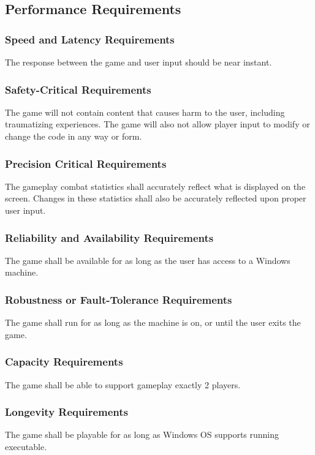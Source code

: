\documentclass{article}
\begin{document}
\subsection{Performance Requirements}

\subsubsection{Speed and Latency Requirements}
The response between the game and user input should be near instant.

\subsubsection{Safety-Critical Requirements}
The game will not contain content that causes harm to the user, including traumatizing experiences. The game will also not allow player input to modify or change the code in any way or form.

\subsubsection{Precision Critical Requirements}
The gameplay combat statistics shall accurately reflect what is displayed on the screen. Changes in these statistics shall also be accurately reflected upon proper user input.

\subsubsection{Reliability and Availability Requirements}
The game shall be available for as long as the user has access to a Windows machine.

\subsubsection{Robustness or Fault-Tolerance Requirements}
The game shall run for as long as the machine is on, or until the user exits the game.

\subsubsection{Capacity Requirements}
The game shall be able to support gameplay exactly 2 players.

\subsubsection{Longevity Requirements}
The game shall be playable for as long as Windows OS supports running executable.
\end{document}
